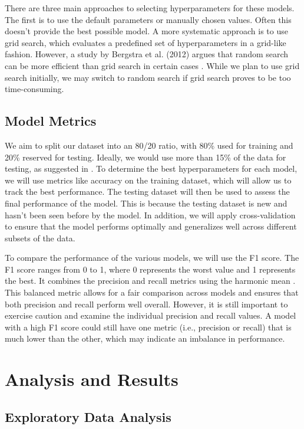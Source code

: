 \documentclass{article}
\begin{document}
\begin{multicols}{2}
There are three main approaches to selecting hyperparameters for these models. The first is to use the default parameters or manually chosen values. Often this doesn't provide the best possible model. A more systematic approach is to use grid search, which evaluates a predefined set of hyperparameters in a grid-like fashion. However, a study by Bergstra et al. (2012) argues that random search can be more efficient than grid search in certain cases \cite{bergstra2012random}. While we plan to use grid search initially, we may switch to random search if grid search proves to be too time-consuming.

\subsection{Model Metrics}

We aim to split our dataset into an 80/20 ratio, with 80\% used for training and 20\% reserved for testing. Ideally, we would use more than 15\% of the data for testing, as suggested in \cite{google_ml_crash_course}. To determine the best hyperparameters for each model, we will use metrics like accuracy on the training dataset, which will allow us to track the best performance. The testing dataset will then be used to assess the final performance of the model. This is because the testing dataset is new and hasn't been seen before by the model. In addition, we will apply cross-validation to ensure that the model performs optimally and generalizes well across different subsets of the data.

To compare the performance of the various models, we will use the F1 score. The F1 score ranges from 0 to 1, where 0 represents the worst value and 1 represents the best. It combines the precision and recall metrics using the harmonic mean \cite{grandini2020metrics}. This balanced metric allows for a fair comparison across models and ensures that both precision and recall perform well overall. However, it is still important to exercise caution and examine the individual precision and recall values. A model with a high F1 score could still have one metric (i.e., precision or recall) that is much lower than the other, which may indicate an imbalance in performance. 

\section{Analysis and Results}

\subsection{Exploratory Data Analysis}  


\end{multicols}
\end{document}
